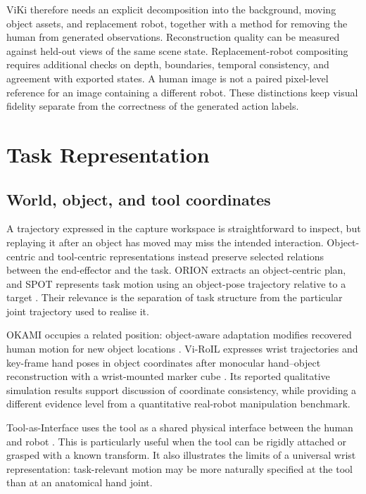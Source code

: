 ViKi therefore needs an explicit decomposition into the background, moving
object assets, and replacement robot, together with a method for removing the
human from generated observations. Reconstruction quality can be measured
against held-out views of the same scene state. Replacement-robot compositing
requires additional checks on depth, boundaries, temporal consistency, and
agreement with exported states. A human image is not a paired pixel-level
reference for an image containing a different robot. These distinctions keep
visual fidelity separate from the correctness of the generated action labels.

\section{Task Representation}
\label{sec:lit-repr}

\subsection{World, object, and tool coordinates}

A trajectory expressed in the capture workspace is straightforward to inspect,
but replaying it after an object has moved may miss the intended interaction.
Object-centric and tool-centric representations instead preserve selected
relations between the end-effector and the task. ORION extracts an
object-centric plan, and SPOT represents task motion using an object-pose
trajectory relative to a target \cite{orion, spot}. Their relevance is the
separation of task structure from the particular joint trajectory used to
realise it.

OKAMI occupies a related position: object-aware adaptation modifies recovered
human motion for new object locations \cite{okami}. Vi-RoIL expresses wrist
trajectories and key-frame hand poses in object coordinates after monocular
hand--object reconstruction with a wrist-mounted marker cube
\cite{viroil}. Its reported qualitative simulation results support discussion
of coordinate consistency, while providing a different evidence level from a
quantitative real-robot manipulation benchmark.

Tool-as-Interface uses the tool as a shared physical interface between the
human and robot \cite{toolif}. This is particularly useful when the tool can
be rigidly attached or grasped with a known transform. It also illustrates the
limits of a universal wrist representation: task-relevant motion may be more
naturally specified at the tool than at an anatomical hand joint.

